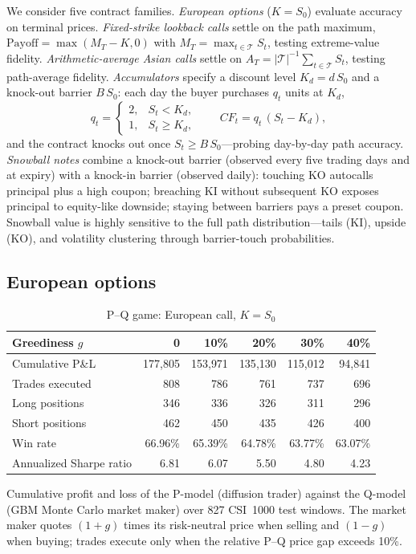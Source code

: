 \documentclass[12pt,letterpaper]{article}
\newcommand{\tabnote}[1]{\begin{minipage}{\linewidth}\vspace{4pt}\footnotesize\singlespacing #1\end{minipage}}
\begin{document}
We consider five contract families. \emph{European options}
($K = S_0$) evaluate accuracy on terminal prices. \emph{Fixed-strike
lookback calls} settle on the path maximum,
$\mathrm{Payoff} = \max(M_T - K, 0)$ with
$M_T = \max_{t\in\mathcal{T}} S_t$, testing extreme-value fidelity.
\emph{Arithmetic-average Asian calls} settle on
$A_T = |\mathcal{T}|^{-1}\sum_{t\in\mathcal{T}} S_t$, testing path-average
fidelity. \emph{Accumulators} specify a discount level $K_d = d\,S_0$ and a
knock-out barrier $B\,S_0$: each day the buyer purchases $q_t$ units at
$K_d$,
\begin{equation}
q_t = \begin{cases} 2, & S_t < K_d,\\ 1, & S_t \ge K_d,\end{cases}
\qquad CF_t = q_t\,(S_t - K_d),
\end{equation}
and the contract knocks out once $S_t \ge B\,S_0$---probing day-by-day path
accuracy. \emph{Snowball notes} combine a knock-out barrier (observed every
five trading days and at expiry) with a knock-in barrier (observed daily):
touching KO autocalls principal plus a high coupon; breaching KI without
subsequent KO exposes principal to equity-like downside; staying between
barriers pays a preset coupon. Snowball value is highly sensitive to the
full path distribution---tails (KI), upside (KO), and volatility clustering
through barrier-touch probabilities.

\subsection{European options}

\begin{table}[ht]
\singlespacing
\centering
\caption{P--Q game: European call, $K = S_0$}
\label{tab:european}
\begin{tabular}{lrrrrr}
\toprule
Greediness $g$ & 0 & 10\% & 20\% & 30\% & 40\% \\
\midrule
Cumulative P\&L & 177{,}805 & 153{,}971 & 135{,}130 & 115{,}012 & 94{,}841 \\
Trades executed & 808 & 786 & 761 & 737 & 696 \\
Long positions  & 346 & 336 & 326 & 311 & 296 \\
Short positions & 462 & 450 & 435 & 426 & 400 \\
Win rate & 66.96\% & 65.39\% & 64.78\% & 63.77\% & 63.07\% \\
Annualized Sharpe ratio & 6.81 & 6.07 & 5.50 & 4.80 & 4.23 \\
\bottomrule
\end{tabular}
\tabnote{Cumulative profit and loss of the P-model (diffusion trader)
against the Q-model (GBM Monte Carlo market maker) over 827 CSI~1000 test
windows. The market maker quotes $(1+g)$ times its risk-neutral price when
selling and $(1-g)$ when buying; trades execute only when the relative P--Q
price gap exceeds 10\%.}
\end{table}
\end{document}
